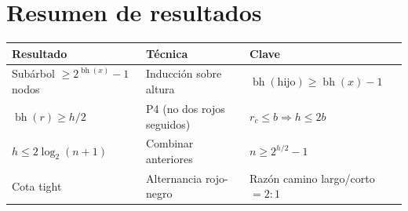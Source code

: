 \documentclass[11pt, letterpaper]{article}
\theoremstyle{definition}
\theoremstyle{plain}
\theoremstyle{remark}
\begin{document}
\section{Resumen de resultados}

\begin{table}[h]
\centering
\begin{tabular}{llp{5.5cm}}
\toprule
\textbf{Resultado} & \textbf{Técnica} & \textbf{Clave} \\
\midrule
Subárbol $\geq 2^{\operatorname{bh}(x)}{-}1$ nodos
  & Inducción sobre altura
  & $\operatorname{bh}(\text{hijo}) \geq \operatorname{bh}(x){-}1$ \\
$\operatorname{bh}(r) \geq h/2$
  & P4 (no dos rojos seguidos)
  & $r_c \leq b \Rightarrow h \leq 2b$ \\
$h \leq 2\log_2(n{+}1)$
  & Combinar anteriores
  & $n \geq 2^{h/2} - 1$ \\
Cota tight
  & Alternancia rojo-negro
  & Razón camino largo/corto $= 2{:}1$ \\
\bottomrule
\end{tabular}
\end{table}
\end{document}
